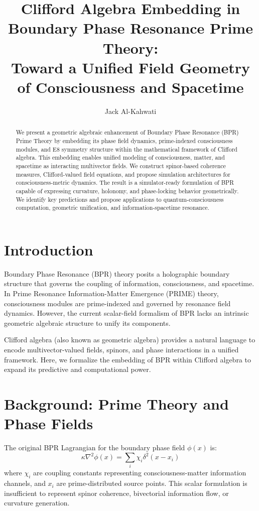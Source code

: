 \documentclass[12pt]{article}
\title{\textbf{Clifford Algebra Embedding in Boundary Phase Resonance Prime Theory:}\\ 
Toward a Unified Field Geometry of Consciousness and Spacetime}
\author[1]{Jack Al-Kahwati}
\affil[1]{\small StarDrive Technologies, Santa Clara, CA, USA\\ \texttt{jack@stardrive.space}}
\date{}
\begin{document}
\maketitle

\begin{abstract}
We present a geometric algebraic enhancement of Boundary Phase Resonance (BPR) Prime Theory by embedding its phase field dynamics, prime-indexed consciousness modules, and E8 symmetry structure within the mathematical framework of Clifford algebra. This embedding enables unified modeling of consciousness, matter, and spacetime as interacting multivector fields. We construct spinor-based coherence measures, Clifford-valued field equations, and propose simulation architectures for consciousness-metric dynamics. The result is a simulator-ready formulation of BPR capable of expressing curvature, holonomy, and phase-locking behavior geometrically. We identify key predictions and propose applications to quantum-consciousness computation, geometric unification, and information-spacetime resonance.
\end{abstract}

\section{Introduction}

Boundary Phase Resonance (BPR) theory posits a holographic boundary structure that governs the coupling of information, consciousness, and spacetime. In Prime Resonance Information-Matter Emergence (PRIME) theory, consciousness modules are prime-indexed and governed by resonance field dynamics. However, the current scalar-field formalism of BPR lacks an intrinsic geometric algebraic structure to unify its components. 

Clifford algebra (also known as geometric algebra) provides a natural language to encode multivector-valued fields, spinors, and phase interactions in a unified framework. Here, we formalize the embedding of BPR within Clifford algebra to expand its predictive and computational power.

\section{Background: Prime Theory and Phase Fields}

The original BPR Lagrangian for the boundary phase field $\phi(x)$ is:
\begin{equation}
    \kappa \nabla^2 \phi(x) = \sum_i \chi_i \delta^2(x - x_i)
\end{equation}
where $\chi_i$ are coupling constants representing consciousness-matter information channels, and $x_i$ are prime-distributed source points. This scalar formulation is insufficient to represent spinor coherence, bivectorial information flow, or curvature generation.
\end{document}
